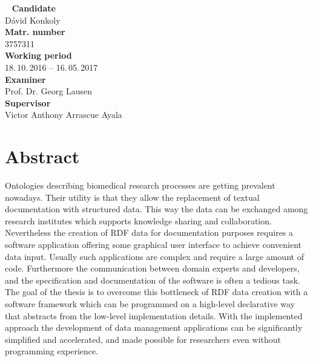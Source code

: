 


%
\newpage
~\vfill
\noindent \textbf{Candidate}\smallskip{}
\\
Dávid Konkoly \smallskip{}
\\
\noindent \textbf{Matr. number}\smallskip{}
\\
3757311 \smallskip{}
\\
\textbf{Working period}\smallskip{}
\\
18.\,10.\,2016 -- 16.\,05.\,2017 \smallskip{}
\\
\textbf{Examiner}\smallskip{}
\\
Prof. Dr. Georg Lausen\smallskip{}
\\
\textbf{Supervisor}\smallskip{}
\\
Victor Anthony Arrascue Ayala\\

\newpage
\chapter*{Abstract}


Ontologies describing biomedical research processes are getting prevalent nowadays. Their utility is that they allow the replacement of textual documentation with structured data. This way the data can be exchanged among research institutes which supports knowledge sharing and collaboration. Nevertheless the creation of RDF data for documentation purposes requires a software application offering some graphical user interface to achieve convenient data input. Usually such applications are complex and require a large amount of code. Furthermore the communication between domain experts and developers, and the specification and documentation of the software is often a tedious task. The goal of the thesis is to overcome this bottleneck of RDF data creation with a software framework which can be programmed on a high-level declarative way that abstracts from the low-level implementation details. With the implemented approach the development of data management applications can be significantly simplified and accelerated, and made possible for researchers even without programming experience.



